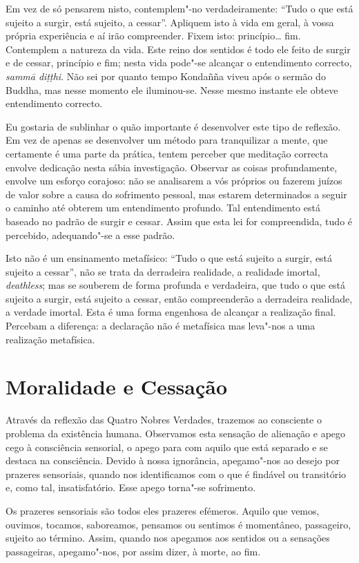 Em vez de só pensarem nisto, contemplem"-no verdadeiramente: “Tudo o que está
sujeito a surgir, está sujeito, a cessar”. Apliquem isto à vida em geral, à
vossa própria experiência e aí irão compreender. Fixem isto: princípio\ldots{}
fim. Contemplem a natureza da vida. Este reino dos sentidos é todo ele feito de
surgir e de cessar, princípio e fim; nesta vida pode"-se alcançar o entendimento
correcto, \emph{sammā diṭṭhi}. Não sei por quanto tempo Kondañña viveu após o
sermão do Buddha, mas nesse momento ele iluminou-se. Nesse mesmo instante ele
obteve entendimento correcto.

Eu gostaria de sublinhar o quão importante é desenvolver este tipo de reflexão.
Em vez de apenas se desenvolver um método para tranquilizar a mente, que
certamente é uma parte da prática, tentem perceber que meditação correcta
envolve dedicação nesta sábia investigação. Observar as coisas profundamente,
envolve um esforço corajoso: não se analisarem a vós próprios ou fazerem juízos
de valor sobre a causa do sofrimento pessoal, mas estarem determinados a seguir
o caminho até obterem um entendimento profundo. Tal entendimento está baseado no
padrão de surgir e cessar. Assim que esta lei for compreendida, tudo é
percebido, adequando"-se a esse padrão.

Isto não é um ensinamento metafísico: “Tudo o que está sujeito a surgir, está
sujeito a cessar”, não se trata da derradeira realidade, a realidade imortal,
\emph{deathless}; mas se souberem de forma profunda e verdadeira, que tudo o que
está sujeito a surgir, está sujeito a cessar, então compreenderão a derradeira
realidade, a verdade imortal. Esta é uma forma engenhosa de alcançar a realização
final. Percebam a diferença: a declaração não é metafísica mas leva"-nos a uma
realização metafísica.

\section{Moralidade e Cessação}

Através da reflexão das Quatro Nobres Verdades, trazemos ao consciente o
problema da existência humana. Observamos esta sensação de alienação e apego
cego à consciência sensorial, o apego para com aquilo que está separado e se
destaca na consciência. Devido à nossa ignorância, apegamo"-nos ao desejo por
prazeres sensoriais, quando nos identificamos com o que é findável ou
transitório e, como tal, insatisfatório. Esse apego torna"-se sofrimento.

Os prazeres sensoriais são todos eles prazeres efémeros. Aquilo que vemos,
ouvimos, tocamos, saboreamos, pensamos ou sentimos é momentâneo, passageiro,
sujeito ao término. Assim, quando nos apegamos aos sentidos ou a sensações
passageiras, apegamo"-nos, por assim dizer, à morte, ao fim.


